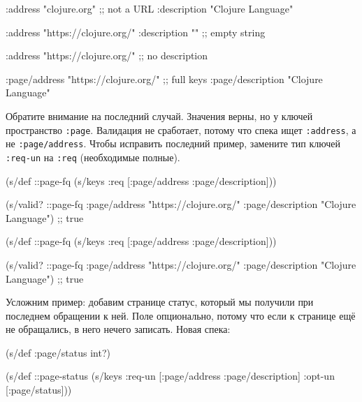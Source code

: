 \else

\begin{english}
  \begin{clojure}
{:address "clojure.org" ;; not a URL
 :description "Clojure Language"}

{:address "https://clojure.org/"
 :description ""} ;; empty string

{:address "https://clojure.org/"} ;; no description

{:page/address "https://clojure.org/" ;; full keys
 :page/description "Clojure Language"}
  \end{clojure}
\end{english}

\fi

Обратите внимание на последний случай. Значения верны, но у ключей пространство
\verb|:page|. Валидация не сработает, потому что спека ищет \verb|:address|,
а не \verb|:page/address|. Чтобы исправить последний пример, замените тип
ключей \verb|:req-un| на \verb|:req| (необходимые полные).


\ifx\DEVICETYPE\MOBILE

\begin{english}
  \begin{clojure}
(s/def ::page-fq
  (s/keys :req [:page/address
                :page/description]))

(s/valid? ::page-fq
  {:page/address "https://clojure.org/"
   :page/description "Clojure Language"})
;; true
  \end{clojure}
\end{english}

\else

\begin{english}
  \begin{clojure}
(s/def ::page-fq
  (s/keys :req [:page/address
                :page/description]))

(s/valid? ::page-fq
          {:page/address "https://clojure.org/"
           :page/description "Clojure Language"})
;; true
  \end{clojure}
\end{english}

\fi

Усложним пример: добавим странице статус, который мы получили при
последнем обращении к ней. Поле опционально, потому что если к странице ещё не
обращались, в него нечего записать. Новая спека:

\begin{english}
  \begin{clojure}
(s/def :page/status int?)

(s/def ::page-status
  (s/keys :req-un [:page/address
                   :page/description]
          :opt-un [:page/status]))
  \end{clojure}
\end{english}

